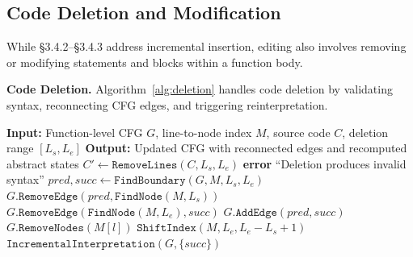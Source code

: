 \documentclass[pdflatex,sn-basic]{sn-jnl}%
\theoremstyle{thmstyleone}%
\theoremstyle{thmstyletwo}%
\theoremstyle{thmstylethree}%
\begin{document}
\subsection{Code Deletion and Modification}\label{sec:deletion}

While \S3.4.2--\S3.4.3 address incremental insertion,
editing also involves removing or modifying statements and blocks within a function body.

\smallskip
\noindent\textbf{Code Deletion.}
Algorithm~\ref{alg:deletion} handles code deletion by
validating syntax, reconnecting CFG edges, and triggering reinterpretation.

\begin{algorithm}[!ht]
\caption{Code Deletion}
\label{alg:deletion}
\begin{algorithmic}[1]
\State \textbf{Input:} Function-level CFG $G$, line-to-node index $M$, source code $C$, deletion range $[L_s, L_e]$
\State \textbf{Output:} Updated CFG with reconnected edges and recomputed abstract states
  \State $C' \gets \texttt{RemoveLines}(C, L_s, L_e)$ 
    \State \textbf{error} ``Deletion produces invalid syntax''
  \EndIf
  \State $pred, succ \gets \texttt{FindBoundary}(G, M, L_s, L_e)$ 
  \State $G.\texttt{RemoveEdge}(pred, \texttt{FindNode}(M, L_s))$ 
  \State $G.\texttt{RemoveEdge}(\texttt{FindNode}(M, L_e), succ)$
  \State $G.\texttt{AddEdge}(pred, succ)$ 
    \State $G.\texttt{RemoveNodes}(M[l])$ 
  \EndFor
  \State $\texttt{ShiftIndex}(M, L_e, L_e - L_s + 1)$ 
  \State $\texttt{IncrementalInterpretation}(G, \{succ\})$ 
\EndFunction
\end{algorithmic}
\end{algorithm}
\end{document}
